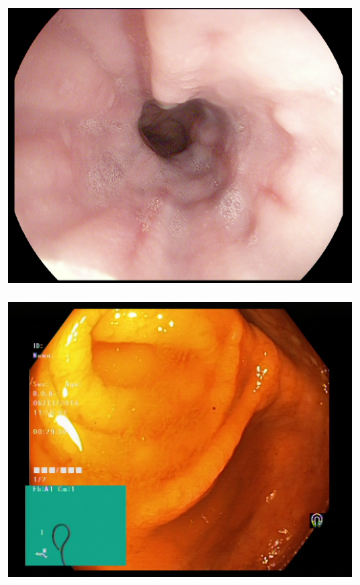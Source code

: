 \begin{figure}[h!]
\begin{subfigure}[b]{0.4\textwidth}
            \caption[Hate to be this guy]%
            {{\small }}    
            \label{fig:polypGAN}
        \end{subfigure}
        \qquad\vfill%
        \begin{subfigure}[b]{0.4\textwidth}   
            \centering 
            \includegraphics[width=\textwidth]{experiments/images/esophagitis.jpg}
            \caption[]%
            {{\small }}    
            \label{fig:zAE}
        \end{subfigure}
        \qquad%
        \begin{subfigure}[b]{0.4\textwidth}   
            \centering 
            \includegraphics[width=\textwidth]{experiments/images/normal-cecum.jpg}

\end{subfigure}
\end{figure}
